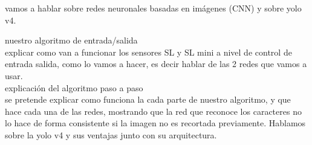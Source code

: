 vamos a hablar sobre redes neuronales basadas en imágenes (CNN) y sobre yolo v4.

nuestro algoritmo de entrada/salida \\

explicar como van a funcionar los sensores SL y SL mini a nivel de control de entrada salida,
como lo vamos a hacer, es decir hablar de las 2 redes que vamos a usar. \\



explicación del algoritmo paso a paso \\

se pretende explicar como funciona la cada parte de nuestro algoritmo, y que hace cada una de las redes, mostrando que la red que reconoce los caracteres no lo hace de forma consistente si la imagen no es recortada previamente. Hablamos sobre la yolo v4 y sus ventajas junto con su arquitectura.

